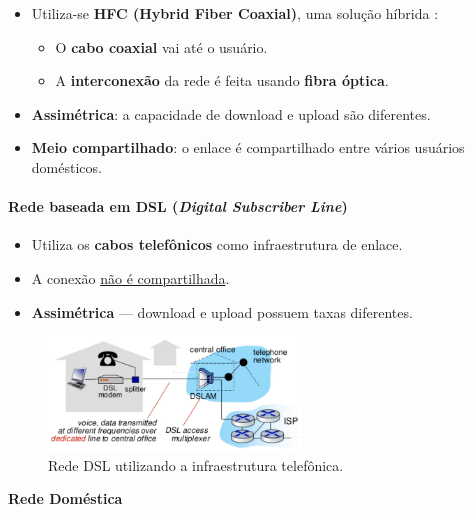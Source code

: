     \begin{itemize}[left=0.5cm, align=left, nosep]
        
        \item Utiliza-se \textbf{HFC (Hybrid Fiber Coaxial)}, uma solução híbrida : 
        \begin{itemize}[left=0.5cm, nosep, label=$\hookrightarrow$]
            \item O \textbf{cabo coaxial} vai até o usuário. 
            \item A \textbf{interconexão} da rede é feita usando \textbf{fibra óptica}. 
        \end{itemize} 
        
        \item \textbf{Assimétrica}: a capacidade de download e upload são diferentes.
        \item \textbf{Meio compartilhado}: o enlace é compartilhado entre vários usuários domésticos.
    \end{itemize}

    \paragraph{Rede baseada em DSL (\textit{Digital Subscriber Line})}
    \begin{itemize}[left=0.5cm, align=left, nosep]
        \item Utiliza os \textbf{cabos telefônicos} como infraestrutura de enlace.
        \item A conexão \underline{não é compartilhada}.
        \item \textbf{Assimétrica} — download e upload possuem taxas diferentes.
    \end{itemize}

    \begin{figure}[H]
        \centering
        \includegraphics[width=0.6\textwidth]{img/cap-01/dsl.png}
        \caption{Rede DSL utilizando a infraestrutura telefônica.}
    \end{figure}

    {\textbf{Rede Doméstica}}


